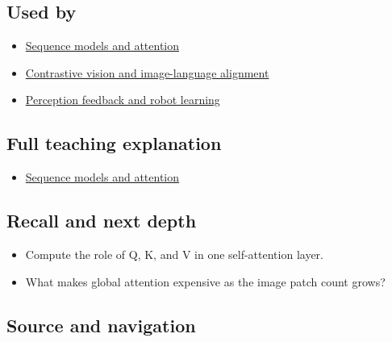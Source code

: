 \subsection{Used by}\label{appendix-a9d5dfdd164a-used-by}

\begin{itemize}
\tightlist
\item
  \hyperref[04-visual-computing-ii-ch031-sequence-models-and-attention]{Sequence models and attention}
\item
  \hyperref[appendix-772f1fd96148]{Contrastive vision and image-language alignment}
\item
  \hyperref[appendix-b0c42da325f1]{Perception feedback and robot learning}
\end{itemize}

\subsection{Full teaching explanation}\label{appendix-a9d5dfdd164a-full-teaching-explanation}

\begin{itemize}
\tightlist
\item
  \hyperref[04-visual-computing-ii-ch031-sequence-models-and-attention]{Sequence models and attention}
\end{itemize}

\subsection{Recall and next depth}\label{appendix-a9d5dfdd164a-recall-and-next-depth}

\begin{itemize}
\tightlist
\item
  Compute the role of Q, K, and V in one self-attention layer.
\item
  What makes global attention expensive as the image patch count grows?
\end{itemize}

\subsection{Source and navigation}\label{appendix-a9d5dfdd164a-source-and-navigation}

